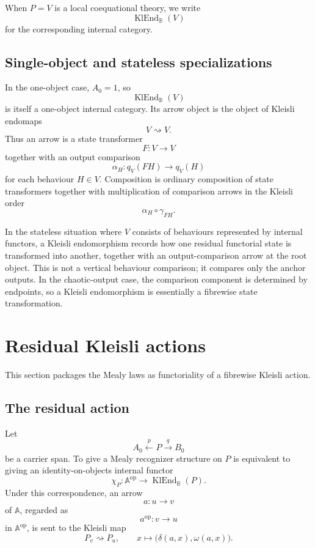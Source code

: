 When \(P=V\) is a local coequational theory, we write
\[
    \operatorname{KlEnd}_{\mathbb B}(V)
\]
for the corresponding internal category.

\subsection{Single-object and stateless specializations}
\label{subsec:klend-single-object-stateless}

In the one-object case, \(A_0=1\), so
\[
    \operatorname{KlEnd}_{\mathbb B}(V)
\]
is itself a one-object internal category. Its arrow object is the object of
Kleisli endomaps
\[
    V\rightsquigarrow V.
\]
Thus an arrow is a state transformer
\[
    F:V\to V
\]
together with an output comparison
\[
    \alpha_H:q_V(FH)\to q_V(H)
\]
for each behaviour \(H\in V\). Composition is ordinary composition of state
transformers together with multiplication of comparison arrows in the Kleisli
order
\[
    \alpha_H\circ\gamma_{FH}.
\]

In the stateless situation where \(V\) consists of behaviours represented by
internal functors, a Kleisli endomorphism records how one residual functorial
state is transformed into another, together with an output-comparison arrow at
the root object. This is not a vertical behaviour comparison; it compares only
the anchor outputs. In the chaotic-output case, the comparison component is
determined by endpoints, so a Kleisli endomorphism is essentially a fibrewise
state transformation.

\section{Residual Kleisli actions}
\label{sec:residual-kleisli-actions}

This section packages the Mealy laws as functoriality of a fibrewise Kleisli
action.

\subsection{The residual action}
\label{subsec:residual-action}

\begin{theorem}
\label{thm:mealy-recognizers-as-kleisli-actions}
    Let
    \[
        A_0\xleftarrow{p}P\xrightarrow{q}B_0
    \]
    be a carrier span. To give a Mealy recognizer structure on \(P\) is
    equivalent to giving an identity-on-objects internal functor
    \[
        \chi_P:
        \mathbb A^{\mathrm{op}}
        \to
        \operatorname{KlEnd}_{\mathbb B}(P).
    \]
    Under this correspondence, an arrow
    \[
        a:u\to v
    \]
    of \(\mathbb A\), regarded as
    \[
        a^{\mathrm{op}}:v\to u
    \]
    in \(\mathbb A^{\mathrm{op}}\), is sent to the Kleisli map
    \[
        P_v\rightsquigarrow P_u,
        \qquad
        x\longmapsto
        \bigl(\delta(a,x),\omega(a,x)\bigr).
    \]
\end{theorem}

